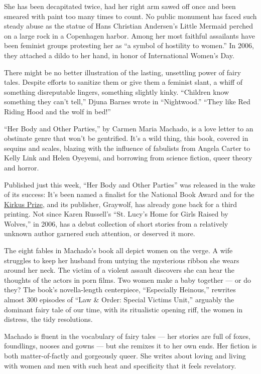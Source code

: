 She has been decapitated twice, had her right arm sawed off once and
been smeared with paint too many times to count. No public monument has
faced such steady abuse as the statue of Hans Christian Andersen's
Little Mermaid perched on a large rock in a Copenhagen harbor. Among her
most faithful assailants have been feminist groups protesting her as ``a
symbol of hostility to women.'' In 2006, they attached a dildo to her
hand, in honor of International Women's Day.

There might be no better illustration of the lasting, unsettling power
of fairy tales. Despite efforts to sanitize them or give them a feminist
slant, a whiff of something disreputable lingers, something slightly
kinky. ``Children know something they can't tell,'' Djuna Barnes wrote
in ``Nightwood.'' ``They like Red Riding Hood and the wolf in bed!''

``Her Body and Other Parties,'' by Carmen Maria Machado, is a love
letter to an obstinate genre that won't be gentrified. It's a wild
thing, this book, covered in sequins and scales, blazing with the
influence of fabulists from Angela Carter to Kelly Link and Helen
Oyeyemi, and borrowing from science fiction, queer theory and horror.

Published just this week, ``Her Body and Other Parties'' was released in
the wake of its success: It's been named a finalist for the National
Book Award and for the
\href{https://www.kirkusreviews.com/prize/2017/finalists/}{Kirkus
Prize}, and its publisher, Graywolf, has already gone back for a third
printing. Not since Karen Russell's ``St. Lucy's Home for Girls Raised
by Wolves,'' in 2006, has a debut collection of short stories from a
relatively unknown author garnered such attention, or deserved it more.

The eight fables in Machado's book all depict women on the verge. A wife
struggles to keep her husband from untying the mysterious ribbon she
wears around her neck. The victim of a violent assault discovers she can
hear the thoughts of the actors in porn films. Two women make a baby
together --- or do they? The book's novella-length centerpiece,
``Especially Heinous,'' rewrites almost 300 episodes of ``Law \& Order:
Special Victims Unit,'' arguably the dominant fairy tale of our time,
with its ritualistic opening riff, the women in distress, the tidy
resolutions.

Machado is fluent in the vocabulary of fairy tales --- her stories are
full of foxes, foundlings, nooses and gowns --- but she remixes it to
her own ends. Her fiction is both matter-of-factly and gorgeously queer.
She writes about loving and living with women and men with such heat and
specificity that it feels revelatory.

